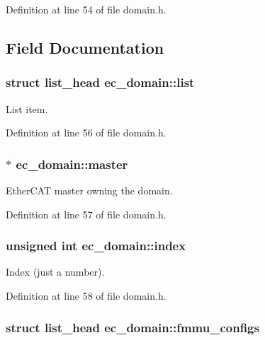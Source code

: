 Definition at line 54 of file domain.\-h.



\subsection{Field Documentation}
\subsubsection[{list}]{\setlength{\rightskip}{0pt plus 5cm}struct list\-\_\-head ec\-\_\-domain\-::list}\label{structec__domain_a2d15a4d54c3c1893bd3902d43380d474}


List item. 



Definition at line 56 of file domain.\-h.

\subsubsection[{master}]{$\ast$ ec\-\_\-domain\-::master}\label{structec__domain_a58e4f4b7d54f30e58c7187268c1525c1}


Ether\-C\-A\-T master owning the domain. 



Definition at line 57 of file domain.\-h.

\subsubsection[{index}]{\setlength{\rightskip}{0pt plus 5cm}unsigned int ec\-\_\-domain\-::index}\label{structec__domain_ac341000021b5790693cc74f7687fb956}


Index (just a number). 



Definition at line 58 of file domain.\-h.

\subsubsection[{fmmu\-\_\-configs}]{\setlength{\rightskip}{0pt plus 5cm}struct list\-\_\-head ec\-\_\-domain\-::fmmu\-\_\-configs}\label{structec__domain_af7578fbb9d9c493a4c086b5c9cc3796b}


